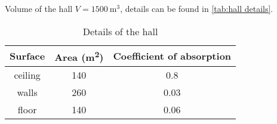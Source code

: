\documentclass[parskip]{scrartcl}
\begin{document}
\blindtext

Volume of the hall \(V = \SI{1500}{\cubic\metre}\), details can be found in \autoref{tab:hall details}.


\begin{table}[h!]
	\centering
	\caption{Details of the hall}
	\label{tab:hall details}
	\begin{tabular}{ccS}
		\toprule
		Surface & Area (\si{\metre\squared}) & {Coefficient of absorption}\\
		\midrule
		ceiling & 140 & 0.8 \\
		walls & 260 & 0.03 \\
		floor & 140 & 0.06 \\
		\bottomrule
	\end{tabular}
\end{table}

\blindtext
\end{document}
